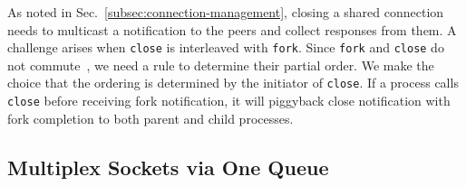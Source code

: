 
As noted in Sec.~\ref{subsec:connection-management}, closing a shared connection needs to multicast a notification to the peers and collect responses from them. A challenge arises when \texttt{close} is interleaved with \texttt{fork}. Since \texttt{fork} and \texttt{close} do not commute~\cite{clements2015scalable}, we need a rule to determine their partial order. We make the choice that the ordering is determined by the initiator of \texttt{close}. If a process calls \texttt{close} before receiving fork notification, it will piggyback close notification with fork completion to both parent and child processes.




\iffalse
\subsection{Multiplex Sockets via One Queue}
\label{subsec:multiplex-conn}

